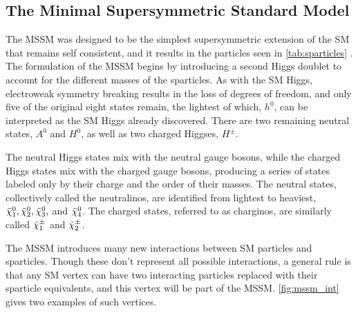 \subsection{The Minimal Supersymmetric Standard Model}

The \acf{MSSM} was designed to be the simplest supersymmetric extension of the \ac{SM} that remains self consistent, and it results in the particles seen in \autoref{tab:sparticles} \cite{Martin:1997ns}. The formulation of the \ac{MSSM} begins by introducing a second Higgs doublet to account for the different masses of the sparticles. As with the \ac{SM} Higgs, electroweak symmetry breaking results in the loss of degrees of freedom, and only five of the original eight states remain, the lightest of which, $h^0$, can be interpreted as the \ac{SM} Higgs already discovered. There are two remaining neutral states, $A^0$ and $H^0$, as well as two charged Higgses, $H^\pm$. 

The neutral Higgs states mix with the neutral gauge bosons, while the charged Higgs states mix with the charged gauge bosons, producing a series of states labeled only by their charge and the order of their masses. The neutral states, collectively called the neutralinos, are identified from lightest to heaviest, $\No[1], \No[2], \No[3],$ and $\No[4]$. The charged states, referred to as charginos, are similarly called $\Co[1]$ and $\Co[2]$.

The \ac{MSSM} introduces many new interactions between \ac{SM} particles and sparticles. Though these don't represent all possible interactions, a general rule is that any \ac{SM} vertex can have two interacting particles replaced with their sparticle equivalents, and this vertex will be part of the \ac{MSSM}. \autoref{fig:mssm_int} gives two examples of such vertices. 

